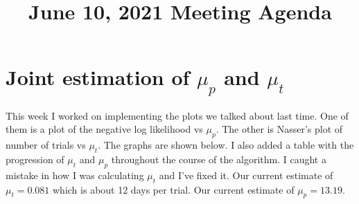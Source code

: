 \documentclass[11pt]{article}
\title{June 10, 2021 Meeting Agenda}
\begin{document}
\maketitle

\section{Joint estimation of $\mu_p$ and $\mu_t$}
This week I worked on implementing the plots we talked about last time. One of them is a plot of
the negative log likelihood vs $\mu_p$. The other is Nasser's plot of number of trials vs $\mu_t$.
The graphs are shown below. I also added a table with the progression of $\mu_t$ and $\mu_p$ throughout the course of the algorithm. I caught a mistake in how I was calculating $\mu_t$ and I've fixed it. Our current estimate of $\mu_t = 0.081$ which is about 12 days per trial. Our current estimate of $\mu_p = 13.19$.
\end{document}
